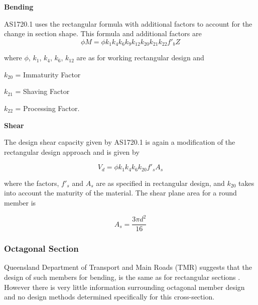\documentclass[11pt,a4paper]{article}
\numberwithin{equation}{subsection}
\begin{document}
	\vspace*{\baselineskip}
	
	\noindent
	\textbf{Bending}\par
	\noindent
    AS1720.1 uses the rectangular formula with additional factors to account for the change in section shape. This formula and additional factors are
	\begin{equation}
	\phi M = \phi k_{1} k_{4} k_{6} k_{9} k_{12} k_{20} k_{21} k_{22} f'_{b} Z
	\end{equation}

    \noindent
    where $\phi$, $k_{1}$, $k_{4}$, $k_{6}$, $k_{12}$ are as for working rectangular design and \par
    
    $ k_{20} $ = Immaturity Factor\par
    
    $ k_{21} $ = Shaving Factor\par
    
    $ k_{22} $ = Processing Factor.\par
	
	\vspace*{\baselineskip}
		
	\noindent
	\textbf{Shear}\par
	\noindent
	The design shear capacity given by AS1720.1 is again a modification of the rectangular design approach and is given by 
	
	\begin{equation}
	V_{d} = \phi k_{1} k_{4} k_{6} k_{20} f'_{s} A_{s}
	\end{equation}
	
	\noindent
	where the factors, $f'_{s}$ and $A_{s}$ are as specified in rectangular design, and $k_{20}$ takes into account the maturity of the material. The shear plane area for a round member is\par
	
	\begin{equation}
	A_{s} = \dfrac{3\pi d^{2}}{16}
	\end{equation}
	
	
	\noindent
	
	\subsubsection{Octagonal Section}
    Queensland Department of Transport and Main Roads (TMR) suggests that the design of such members for bending, is the same as for rectangular sections \cite{_timber_2005}. However there is very little information surrounding octagonal member design and no design methods determined specifically for this cross-section.
\end{document}
